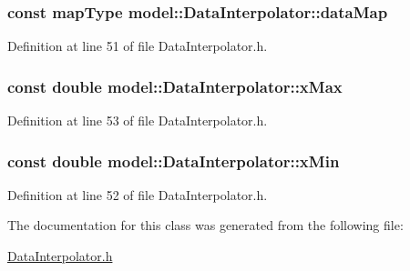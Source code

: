 \subsubsection[{data\+Map}]{\setlength{\rightskip}{0pt plus 5cm}const map\+Type model\+::\+Data\+Interpolator\+::data\+Map}\label{classmodel_1_1_data_interpolator_a8792cf75c688d4834522a063392a4c45}


Definition at line 51 of file Data\+Interpolator.\+h.

\hypertarget{classmodel_1_1_data_interpolator_a4809d3bc604654822943169bc5d84261}{}
\subsubsection[{x\+Max}]{\setlength{\rightskip}{0pt plus 5cm}const double model\+::\+Data\+Interpolator\+::x\+Max}\label{classmodel_1_1_data_interpolator_a4809d3bc604654822943169bc5d84261}


Definition at line 53 of file Data\+Interpolator.\+h.

\hypertarget{classmodel_1_1_data_interpolator_a809d0d89dbfa011a34b38d8525016fb5}{}
\subsubsection[{x\+Min}]{\setlength{\rightskip}{0pt plus 5cm}const double model\+::\+Data\+Interpolator\+::x\+Min}\label{classmodel_1_1_data_interpolator_a809d0d89dbfa011a34b38d8525016fb5}


Definition at line 52 of file Data\+Interpolator.\+h.



The documentation for this class was generated from the following file\+:\begin{DoxyCompactItemize}
\item 
\hyperlink{_data_interpolator_8h}{Data\+Interpolator.\+h}\end{DoxyCompactItemize}
